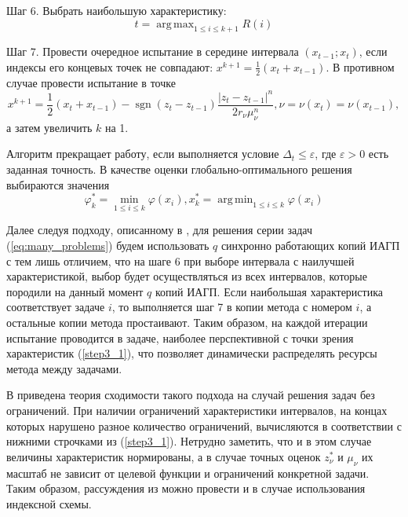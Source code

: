 \documentclass{cmi}
\DeclareMathOperator*{\argmax}{arg\,max}
\DeclareMathOperator*{\argmin}{arg\,min}
\begin{document}
Шаг 6. Выбрать наибольшую характеристику:
\begin{equation}
\label{step4}
t=\argmax_{1\leqslant i \leqslant k+1}R(i)
\end{equation}

Шаг 7. Провести очередное испытание в середине интервала \((x_{t-1};x_{t})\),
если индексы его концевых точек не совпадают: \(x^{k+1}={\frac {1}{2}}(x_{t}+x_{t-1})\).
В противном случае провести испытание в точке
\begin{displaymath}
  x^{k+1}={\frac {1}{2}}(x_{t}+x_{t-1})-\operatorname {sgn}(z_{t}-z_{t-1}){\frac {|z_{t}-z_{t-1}|^{n}}{2r_{\nu }\mu _{\nu }^{n}}},\nu =\nu (x_{t})=\nu (x_{t-1}),
\end{displaymath}
а затем увеличить \(k\) на 1.

Алгоритм прекращает работу, если выполняется условие \(\Delta_{t}\leqslant \varepsilon\),
где \(\varepsilon>0\) есть заданная точность. В качестве оценки глобально-оптимального решения выбираются значения
\begin{equation}
\varphi_k^*=\min_{1\leqslant i \leqslant k}\varphi(x_i), x_k^*=\argmin_{1\leqslant i \leqslant k}\varphi(x_i)
\end{equation}

Далее следуя подходу, описанному в \cite{BarkalovStrongin2018}, для решения серии задач (\ref{eq:many_problems}) будем
использовать \(q\) синхронно работающих копий ИАГП с тем лишь отличием, что на шаге 6 при выборе
интервала с наилучшей характеристикой, выбор будет осуществляться из всех интервалов, которые
породили на данный момент \(q\) копий ИАГП. Если наибольшая характеристика соответствует
задаче \(i\), то выполняется шаг 7 в копии метода с номером \(i\), а остальные копии метода простаивают.
Таким образом, на каждой итерации испытание проводится в задаче, наиболее перспективной с точки зрения
характеристик (\ref{step3_1}), что позволяет динамически распределять ресурсы метода между задачами.

В \cite{BarkalovStrongin2018} приведена теория сходимости такого подхода на случай решения задач без ограничений.
При наличии ограничений характеристики интервалов, на концах которых нарушено разное количество ограничений,
вычисляются в соответствии с нижними строчками из (\ref{step3_1}). Нетрудно заметить, что и в этом случае
величины характеристик нормированы, а в случае точных оценок \(z_{\nu }^{*}\) и \(\mu _{\nu }\) их
масштаб не зависит от целевой функции и ограничений конкретной задачи. Таким образом, рассуждения
из \cite{BarkalovStrongin2018} можно провести и в случае использования индексной схемы.
\end{document}

